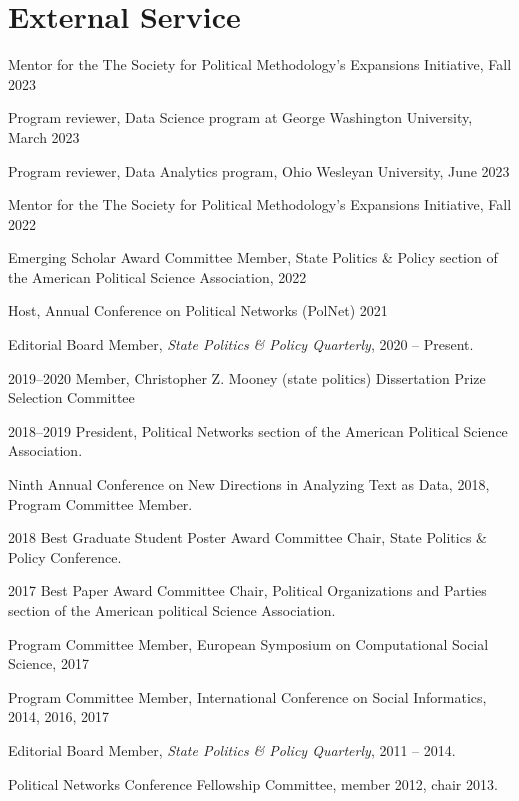 \documentclass[overlapped,line]{res}
\begin{document}
\begin{resume}
\begin{etaremune}
\end{etaremune}



\section{\bf External Service}
\vspace{.41cm} 
\begin{etaremune}
\item Mentor for the The Society for Political Methodology’s Expansions Initiative, Fall 2023
\item Program reviewer, Data Science program at George Washington University, March 2023
\item Program reviewer, Data Analytics program, Ohio Wesleyan University, June 2023
\item Mentor for the The Society for Political Methodology’s Expansions Initiative, Fall 2022
\item Emerging Scholar Award Committee Member, State Politics \& Policy section of the American Political Science Association, 2022
\item Host, Annual Conference on Political Networks (PolNet) 2021
\item Editorial Board Member, {\em State Politics \& Policy Quarterly},  2020 -- Present.
\item  2019--2020 Member, Christopher Z. Mooney (state politics) Dissertation Prize Selection Committee
\item 2018--2019 President, Political Networks section of the American Political Science Association.
\item Ninth Annual Conference on New Directions in Analyzing Text as Data, 2018, Program Committee Member. 
\item 2018 Best Graduate Student Poster Award Committee Chair, State Politics \& Policy Conference.
\item 2017 Best Paper Award Committee Chair, Political Organizations and Parties section of the American political Science Association.
\item Program Committee Member, European Symposium on Computational Social Science, 2017
\item Program Committee Member, International Conference on Social Informatics, 2014, 2016, 2017
\item Editorial Board Member, {\em State Politics \& Policy Quarterly},  2011 -- 2014.
\item Political Networks Conference Fellowship Committee, member 2012, chair 2013.

\end{etaremune}
\end{resume}
\end{document}
